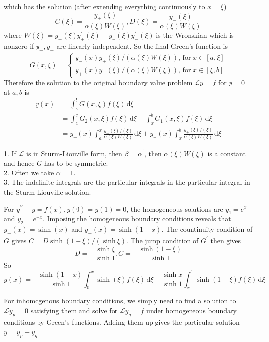 which has the solution (after extending everything continuously to $x=\xi$)
$$C(\xi)=\frac{y_+(\xi)}{\alpha(\xi)W(\xi)},D(\xi)=\frac{y_-(\xi)}{\alpha(\xi)W(\xi)}$$
where $W(\xi)=y_-(\xi)y_+^\prime(\xi)-y_+(\xi)y_-^\prime(\xi)$ is the Wronskian which is nonzero if $y_+,y_-$ are linearly independent.
So the final Green's function is
$$G(x,\xi)=\begin{cases}
    y_-(x)y_+(\xi)/(\alpha(\xi)W(\xi))\text{, for $x\in[a,\xi]$}\\
    y_+(x)y_-(\xi)/(\alpha(\xi)W(\xi))\text{, for $x\in[\xi,b]$}
\end{cases}$$
Therefore the solution to the original boundary value problem $\mathcal Ly=f$ for $y=0$ at $a,b$ is
\begin{align*}
    y(x)&=\int_a^bG(x,\xi)f(\xi)\,\mathrm d\xi\\
    &=\int_a^xG_2(x,\xi)f(\xi)\,\mathrm d\xi+\int_x^bG_1(x,\xi)f(\xi)\,\mathrm d\xi\\
    &=y_+(x)\int_a^x\frac{y_-(\xi)f(\xi)}{\alpha(\xi)W(\xi)}\,\mathrm d\xi+y_-(x)\int_x^b\frac{y_+(\xi)f(\xi)}{\alpha(\xi)W(\xi)}\,\mathrm d\xi
\end{align*}
\begin{note}
    1. If $\mathcal L$ is in Sturm-Liouville form, then $\beta=\alpha^\prime$, then $\alpha(\xi)W(\xi)$ is a constant and hence $G$ has to be symmetric.\\
    2. Often we take $\alpha=1$.\\
    3. The indefinite integrals are the particular integrals in the particular integral in the Sturm-Liouville solution.
\end{note}
\begin{example}
    For $y^{\prime\prime}-y=f(x),y(0)=y(1)=0$, the homogeneous solutions are $y_1=e^x$ and $y_2=e^{-x}$.
    Imposing the homogeneous boundary conditions reveals that $y_-(x)=\sinh(x)$ and $y_+(x)=\sinh(1-x)$.
    The countinuity condition of $G$ gives $C=D\sinh(1-\xi)/(\sinh\xi)$.
    The jump condition of $G^\prime$ then gives
    $$D=-\frac{\sinh\xi}{\sinh 1},C=-\frac{\sinh(1-\xi)}{\sinh 1}$$
    So
    $$y(x)=-\frac{\sinh(1-x)}{\sinh 1}\int_0^x\sinh(\xi)f(\xi)\,\mathrm d\xi-\frac{\sinh x}{\sinh 1}\int_x^1\sinh(1-\xi)f(\xi)\,\mathrm d\xi$$
\end{example}
For inhomogenous boundary conditions, we simply need to find a solution to $\mathcal Ly_p=0$ satisfying them and solve for $\mathcal Ly_g=f$ under homogeneous boundary conditions by Green's functions.
Adding them up gives the particular solution $y=y_p+y_g$.

